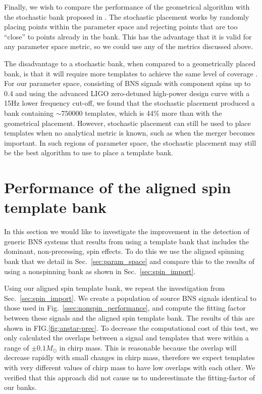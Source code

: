Finally, we wish to compare the performance of the geometrical algorithm with the stochastic bank proposed in
\cite{Harry:2009ea,Babak:2008rb}. The stochastic placement works by randomly placing points within the parameter
space and rejecting points that are too ``close'' to points already in the bank. This
has the advantage that it is valid for any parameter space metric, so we could use any of the metrics discussed
above. 

The disadvantage to a stochastic bank, when compared to a geometrically placed bank, is that it will require more
templates to achieve the same level of coverage \cite{Harry:2009ea,Manca:2009xw}.
For our parameter space, consisting of BNS signals with
component spins up to 0.4 and using the advanced LIGO zero-detuned high-power design curve with a 15Hz lower
frequency cut-off, we found that the stochastic placement
produced a bank containing $\sim 750000$ templates, which is 44\% more than with the geometrical placement.
However, stochastic placement can still be used to place templates when no analytical metric is known, such
as when the merger becomes important. In such regions of parameter space, the stochastic placement may still be the best
algorithm to use to place a template bank.

\section{Performance of the aligned spin template bank}
\label{sec:aligned_spin_performance}

In this section we would like to investigate the improvement in the 
detection of generic BNS systems that results from using a template bank
that includes the dominant, non-precessing, spin effects. To do this we use the aligned spinning bank that
we detail in Sec.~\ref{sec:param_space} and compare this to the results of using a nonspinning bank 
as shown in Sec.~\ref{sec:spin_import}. 

Using our aligned spin template bank, we repeat the investigation from Sec.~\ref{sec:spin_import}. We create a 
population of source BNS signals identical to those used in Fig.~\ref{ssec:nonspin_performance}, and compute the fitting factor
between these signals and the aligned spin template bank. The results of this are shown in FIG.\ref{fig:anstar-prec}.
To decrease the computational cost of this test, we only calculated the overlaps between a signal and templates that
were within a range of $\pm0.1M_{\odot}$ in chirp mass. This is reasonable because the overlap will decrease rapidly
with small changes in chirp mass,
therefore we expect templates with very different values of chirp mass to have low overlaps with each other. We verified
that this approach did not cause us to underestimate the fitting-factor of our banks.

